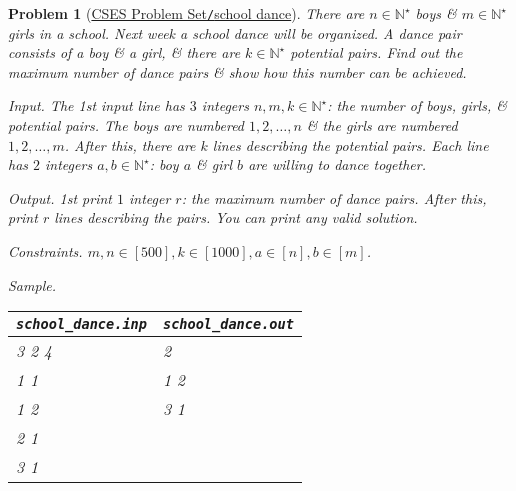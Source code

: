 \documentclass{article}
\newtheorem{problem}{Problem}
\begin{document}
\begin{problem}[\href{https://cses.fi/problemset/task/1696}{CSES Problem Set{\tt/}school dance}]
    There are $n\in\mathbb{N}^\star$ boys \& $m\in\mathbb{N}^\star$ girls in a school. Next week a school dance will be organized. A dance pair consists of a boy \& a girl, \& there are $k\in\mathbb{N}^\star$ potential pairs. Find out the maximum number of dance pairs \& show how this number can be achieved.
    \item {\sf Input.} The 1st input line has $3$ integers $n,m,k\in\mathbb{N}^\star$: the number of boys, girls, \& potential pairs. The boys are numbered $1,2,\ldots,n$ \& the girls are numbered $1,2,\ldots,m$. After this, there are $k$ lines describing the potential pairs. Each line has $2$ integers $a,b\in\mathbb{N}^\star$: boy $a$ \& girl $b$ are willing to dance together.
    \item {\sf Output.} 1st print $1$ integer $r$: the maximum number of dance pairs. After this, print $r$ lines describing the pairs. You can print any valid solution.
    \item {\sf Constraints.} $m,n\in[500],k\in[1000],a\in[n],b\in[m]$.
    \item {\sf Sample.}
    \begin{table}[H]
        \centering
        \begin{tabular}{|l|l|}
            \hline
            \verb|school_dance.inp| & \verb|school_dance.out| \\
            \hline
            3 2 4 & 2 \\
            1 1 & 1 2 \\
            1 2 & 3 1 \\
            2 1 & \\
            3 1 & \\
            \hline
        \end{tabular}
    \end{table}
\end{problem}
\end{document}
